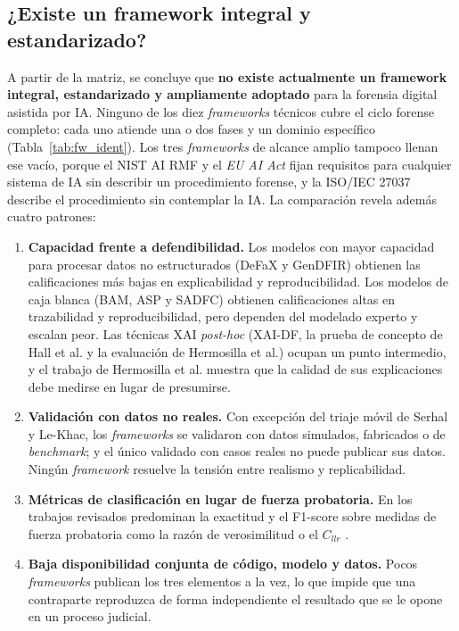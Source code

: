 \documentclass[journal]{IEEEtran}
\begin{document}
\subsection{¿Existe un framework integral y estandarizado?}
A partir de la matriz, se concluye que \textbf{no existe actualmente un framework integral, estandarizado y ampliamente adoptado} para la forensia digital asistida por IA. Ninguno de los diez \textit{frameworks} técnicos cubre el ciclo forense completo: cada uno atiende una o dos fases y un dominio específico (Tabla~\ref{tab:fw_ident}). Los tres \textit{frameworks} de alcance amplio tampoco llenan ese vacío, porque el NIST AI RMF y el \textit{EU AI Act} fijan requisitos para cualquier sistema de IA sin describir un procedimiento forense, y la ISO/IEC 27037 describe el procedimiento sin contemplar la IA. La comparación revela además cuatro patrones:
\begin{enumerate}
    \item \textbf{Capacidad frente a defendibilidad.} Los modelos con mayor capacidad para procesar datos no estructurados (DeFaX y GenDFIR) obtienen las calificaciones más bajas en explicabilidad y reproducibilidad. Los modelos de caja blanca (BAM, ASP y SADFC) obtienen calificaciones altas en trazabilidad y reproducibilidad, pero dependen del modelado experto y escalan peor. Las técnicas XAI \textit{post-hoc} (XAI-DF, la prueba de concepto de Hall et al. y la evaluación de Hermosilla et al.) ocupan un punto intermedio, y el trabajo de Hermosilla et al. muestra que la calidad de sus explicaciones debe medirse en lugar de presumirse.
    \item \textbf{Validación con datos no reales.} Con excepción del triaje móvil de Serhal y Le-Khac, los \textit{frameworks} se validaron con datos simulados, fabricados o de \textit{benchmark}; y el único validado con casos reales no puede publicar sus datos. Ningún \textit{framework} resuelve la tensión entre realismo y replicabilidad.
    \item \textbf{Métricas de clasificación en lugar de fuerza probatoria.} En los trabajos revisados predominan la exactitud y el F1-score sobre medidas de fuerza probatoria como la razón de verosimilitud o el $C_{llr}$ \cite{WarrenEricM.2025Ceal}.
    \item \textbf{Baja disponibilidad conjunta de código, modelo y datos.} Pocos \textit{frameworks} publican los tres elementos a la vez, lo que impide que una contraparte reproduzca de forma independiente el resultado que se le opone en un proceso judicial.
\end{enumerate}
\end{document}
